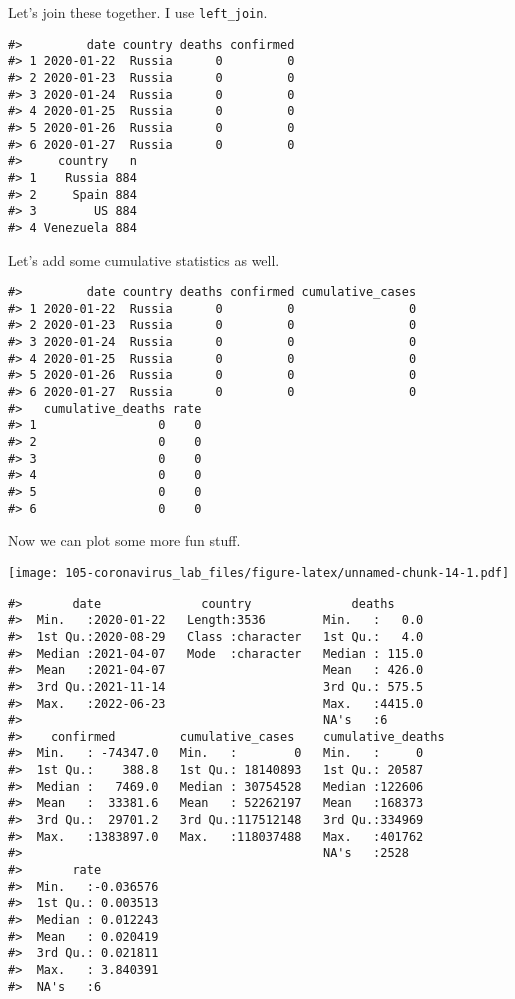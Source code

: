 \documentclass[
]{book}
\begin{document}
Let's join these together. I use \texttt{left\_join}.

\begin{verbatim}
#>         date country deaths confirmed
#> 1 2020-01-22  Russia      0         0
#> 2 2020-01-23  Russia      0         0
#> 3 2020-01-24  Russia      0         0
#> 4 2020-01-25  Russia      0         0
#> 5 2020-01-26  Russia      0         0
#> 6 2020-01-27  Russia      0         0
#>     country   n
#> 1    Russia 884
#> 2     Spain 884
#> 3        US 884
#> 4 Venezuela 884
\end{verbatim}

Let's add some cumulative statistics as well.

\begin{verbatim}
#>         date country deaths confirmed cumulative_cases
#> 1 2020-01-22  Russia      0         0                0
#> 2 2020-01-23  Russia      0         0                0
#> 3 2020-01-24  Russia      0         0                0
#> 4 2020-01-25  Russia      0         0                0
#> 5 2020-01-26  Russia      0         0                0
#> 6 2020-01-27  Russia      0         0                0
#>   cumulative_deaths rate
#> 1                 0    0
#> 2                 0    0
#> 3                 0    0
#> 4                 0    0
#> 5                 0    0
#> 6                 0    0
\end{verbatim}

Now we can plot some more fun stuff.

\texttt{[image: 105-coronavirus\_lab\_files/figure-latex/unnamed-chunk-14-1.pdf]}

\begin{verbatim}
#>       date              country              deaths      
#>  Min.   :2020-01-22   Length:3536        Min.   :   0.0  
#>  1st Qu.:2020-08-29   Class :character   1st Qu.:   4.0  
#>  Median :2021-04-07   Mode  :character   Median : 115.0  
#>  Mean   :2021-04-07                      Mean   : 426.0  
#>  3rd Qu.:2021-11-14                      3rd Qu.: 575.5  
#>  Max.   :2022-06-23                      Max.   :4415.0  
#>                                          NA's   :6       
#>    confirmed         cumulative_cases    cumulative_deaths
#>  Min.   : -74347.0   Min.   :        0   Min.   :     0   
#>  1st Qu.:    388.8   1st Qu.: 18140893   1st Qu.: 20587   
#>  Median :   7469.0   Median : 30754528   Median :122606   
#>  Mean   :  33381.6   Mean   : 52262197   Mean   :168373   
#>  3rd Qu.:  29701.2   3rd Qu.:117512148   3rd Qu.:334969   
#>  Max.   :1383897.0   Max.   :118037488   Max.   :401762   
#>                                          NA's   :2528     
#>       rate          
#>  Min.   :-0.036576  
#>  1st Qu.: 0.003513  
#>  Median : 0.012243  
#>  Mean   : 0.020419  
#>  3rd Qu.: 0.021811  
#>  Max.   : 3.840391  
#>  NA's   :6
\end{verbatim}
\end{document}
